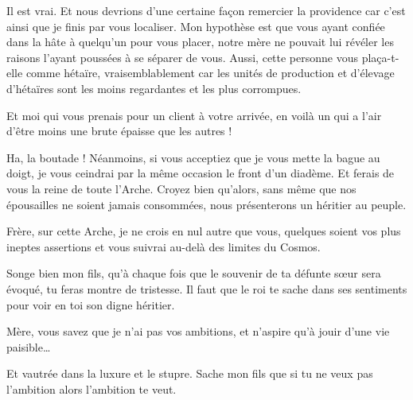 \begin{drama}
   \elenaspeaks Il est vrai. Et nous devrions d’une certaine façon remercier la providence car c’est ainsi que je finis par vous localiser. Mon hypothèse est que vous ayant confiée dans la hâte à quelqu’un pour vous placer, notre mère ne pouvait lui révéler les raisons l’ayant poussées à se séparer de vous. Aussi, cette personne vous plaça-t-elle comme hétaïre, vraisemblablement car les unités de production et d’élevage d’hétaïres sont les moins regardantes et les plus corrompues.

   \elaspeaks {} Et moi qui vous prenais pour un client à votre arrivée, en voilà un qui a l’air d’être moins une brute épaisse que les autres !

   \elaspeaks Ha, la boutade ! %
   Néanmoins,
   si vous acceptiez que je vous mette la bague au doigt, je vous ceindrai par la même occasion le front d’un diadème. Et ferais de vous la reine de toute l’Arche. Croyez bien qu’alors, sans même que nos épousailles ne soient jamais consommées, nous présenterons un héritier au peuple.%

   \elaspeaks Frère, sur cette Arche, je ne crois en nul autre que vous, quelques soient vos plus ineptes assertions et vous suivrai au-delà des limites du Cosmos.
\end{drama}


\scene

\StageDirII{\reine, \vladimir}



\begin{drama}

  \reinespeaks Songe bien mon fils, qu’à chaque fois que le souvenir de ta défunte sœur sera évoqué, tu feras montre de tristesse. Il faut que le roi te sache dans ses sentiments pour voir en toi son digne héritier.%

  \vladimirspeaks Mère, vous savez que je n’ai pas vos ambitions, et n’aspire qu’à jouir d’une vie paisible…

  \reinespeaks Et vautrée dans la luxure et le stupre. Sache mon fils que si tu ne veux pas l’ambition alors l’ambition te veut.
\end{drama}

